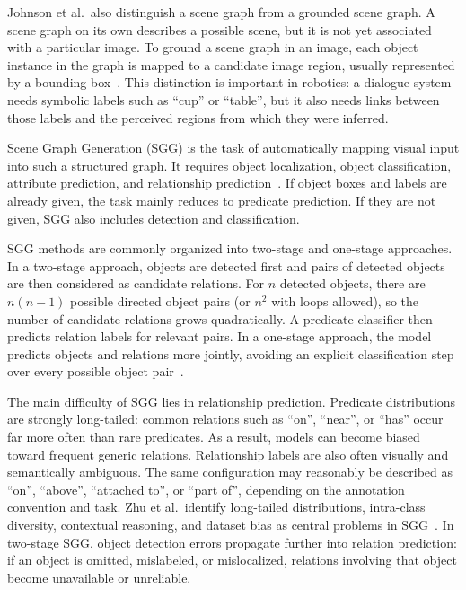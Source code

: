 Johnson et al.\ also distinguish a scene graph from a grounded scene graph. A scene graph on its own describes a possible scene, but it is not yet associated with a particular image. To ground a scene graph in an image, each object instance in the graph is mapped to a candidate image region, usually represented by a bounding box~\cite[3669]{johnson_image_2015}. This distinction is important in robotics: a dialogue system needs symbolic labels such as \enquote{cup} or \enquote{table}, but it also needs links between those labels and the perceived regions from which they were inferred.


Scene Graph Generation (SGG) is the task of automatically mapping visual input into such a structured graph. It requires object localization, object classification, attribute prediction, and relationship prediction~\cite{zhu_scene_2022}. If object boxes and labels are already given, the task mainly reduces to predicate prediction. If they are not given, SGG also includes detection and classification.

SGG methods are commonly organized into two-stage and one-stage approaches. In a two-stage approach, objects are detected first and pairs of detected objects are then considered as candidate relations. For \(n\) detected objects, there are \(n(n-1)\) possible directed object pairs (or \(n^2\) with loops allowed), so the number of candidate relations grows quadratically. A predicate classifier then predicts relation labels for relevant pairs. In a one-stage approach, the model predicts objects and relations more jointly, avoiding an explicit classification step over every possible object pair~\cite{zhu_scene_2022}.


The main difficulty of SGG lies in relationship prediction. Predicate distributions are strongly long-tailed: common relations such as \enquote{on}, \enquote{near}, or \enquote{has} occur far more often than rare predicates. As a result, models can become biased toward frequent generic relations. Relationship labels are also often visually and semantically ambiguous. The same configuration may reasonably be described as \enquote{on}, \enquote{above}, \enquote{attached to}, or \enquote{part of}, depending on the annotation convention and task. Zhu et al.\ identify long-tailed distributions, intra-class diversity, contextual reasoning, and dataset bias as central problems in SGG~\cite{zhu_scene_2022}. In two-stage SGG, object detection errors propagate further into relation prediction: if an object is omitted, mislabeled, or mislocalized, relations involving that object become unavailable or unreliable.


